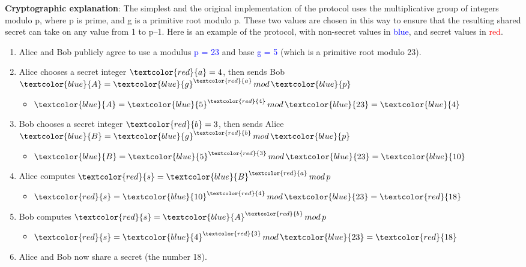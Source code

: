 \textbf{Cryptographic explanation}:
\newline
The simplest and the original implementation of the protocol uses the multiplicative group of integers modulo p, where p is prime, and g is a primitive root modulo p.
These two values are chosen in this way to ensure that the resulting shared secret can take on any value from 1 to p–1.
Here is an example of the protocol, with non-secret values in \textcolor{blue}{blue}, and secret values in \textcolor{red}{red}.
\newline
\begin{enumerate}
    \item Alice and Bob publicly agree to use a modulus \textcolor{blue}{p = 23} and base \textcolor{blue}{g = 5} (which is a primitive root modulo 23).

    \item Alice chooses a secret integer $\textcolor{red}{a} = 4$, then sends Bob $\textcolor{blue}{A} = \textcolor{blue}{g}^{\textcolor{red}{a}} \, mod  \, \textcolor{blue}{p}$
    \begin{itemize}
        \item $\textcolor{blue}{A} = \textcolor{blue}{5}^{\textcolor{red}{4}} \, mod  \, \textcolor{blue}{23} = \textcolor{blue}{4}$
    \end{itemize}

    \item Bob chooses a secret integer $\textcolor{red}{b} = 3$, then sends Alice $\textcolor{blue}{B} = \textcolor{blue}{g}^{\textcolor{red}{b}} \, mod  \, \textcolor{blue}{p}$
    \begin{itemize}
        \item $\textcolor{blue}{B} = \textcolor{blue}{5}^{\textcolor{red}{3}} \, mod  \, \textcolor{blue}{23} = \textcolor{blue}{10}$
    \end{itemize}

    \item Alice computes $\textcolor{red}{s} = \textcolor{blue}{B}^{\textcolor{red}{a}} \, mod \, p$
    \begin{itemize}
        \item $\textcolor{red}{s} = \textcolor{blue}{10}^{\textcolor{red}{4}} \, mod \, \textcolor{blue}{23} = \textcolor{red}{18}$
    \end{itemize}

    \item Bob computes $\textcolor{red}{s} = \textcolor{blue}{A}^{\textcolor{red}{b}} \, mod \, p$
    \begin{itemize}
        \item $\textcolor{red}{s} = \textcolor{blue}{4}^{\textcolor{red}{3}} \, mod \, \textcolor{blue}{23} = \textcolor{red}{18}$
    \end{itemize}

    \item Alice and Bob now share a secret (the number 18).
\end{enumerate}

